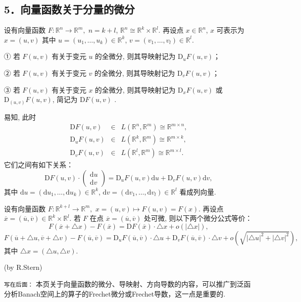 \subsection{5．向量函数关于分量的微分}
设有向量函数 $F:\mathbb{R}^{n}\rightarrow\mathbb{R}^{m},$ $n=k+l$, $\mathbb{R}^{n}\cong\mathbb{R}^{k}\times\mathbb{R}^{l}$.
再设点 $x\in\mathbb{R}^{n}$, $x$ 可表示为 $x=(u,v)$ 其中 $u=(u_{1},\ldots,u_{k})\in\mathbb{R}^{k}$,
$v=(v_{1},\ldots,v_{l})\in\mathbb{R}^{l}.$ 

① 若 $F(u,v)$ 有关于变元 $u$ 的全微分, 则其导映射记为 $\mathrm{D}_{u}F(u,v)$；

② 若 $F(u,v)$ 有关于变元 $v$ 的全微分, 则其导映射记为 $\mathrm{D}_{v}F(u,v)$；

③ 若 $F(u,v)$ 有关于变元 $x$ 的全微分, 则其导映射记为 $\mathrm{D}_{x}F(u,v)$ 或 $\mathrm{D}_{(u,v)}F(u,v)$,
简记为 $\mathrm{D}F(u,v)$ . 

易知, 此时 
$$
\begin{eqnarray*}
\mathrm{D}F(u,v) & \in & L(\mathbb{R}^{n},\mathbb{R}^{m})\cong\mathbb{R}^{m\times n},\\
\mathrm{D}_{u}F(u,v) & \in & L(\mathbb{R}^{k},\mathbb{R}^{m})\cong\mathbb{R}^{m\times k},\\
\mathrm{D}_{v}F(u,v) & \in & L(\mathbb{R}^{l},\mathbb{R}^{m})\cong\mathbb{R}^{m\times l}.
\end{eqnarray*}
$$
它们之间有如下关系：
$$
\mathrm{D}F(u,v)\cdot\left(\begin{array}{c}
\mathrm{d}u\\
\mathrm{d}v
\end{array}\right)=\mathrm{D}_{u}F(u,v)\mathrm{d}u+\mathrm{D}_{v}F(u,v)\mathrm{d}v,
$$
其中 $\mathrm{d}u=(\mathrm{d}u_{1},\ldots,\mathrm{d}u_{k})\in\mathbb{R}^{k}$,
$\mathrm{d}v=(\mathrm{d}v_{1},\ldots,\mathrm{d}v_{l})\in\mathbb{R}^{l}$
看成列向量. 

设有向量函数 $F:\mathbb{R}^{k+l}\rightarrow\mathbb{R}^{m},$ $x=(u,v)\mapsto F(u,v)=F(x)$.
再设点 $\overline{x}=(\overline{u},\overline{v})\in\mathbb{R}^{k}\times\mathbb{R}^{l}.$
若 $F$ 在点 $\overline{x}=(\overline{u},\overline{v})$ 处可微, 则以下两个微分公式等价：
\[
F(\overline{x}+\triangle x)-F(\overline{x})=\mathrm{D}F(\overline{x})\cdot\triangle x+o(|\triangle x|),
\]
\[
F(\overline{u}+\triangle u,\overline{v}+\triangle v)-F(\overline{u},\overline{v})=\mathrm{D}_{u}F(\overline{u},\overline{v})\cdot\triangle u+\mathrm{D}_{v}F(\overline{u},\overline{v})\cdot\triangle v+o(\sqrt{|\triangle u|^{2}+|\triangle v|^{2}}),
\]
其中 $\triangle x=(\triangle u,\triangle v)$.

(by R.Stern)


\verb|写在后面：| 本页关于向量函数的微分、导映射、方向导数的内容，可以推广到泛函分析Banach空间上的算子的Frechet微分或Frechet导数，这一点是重要的.